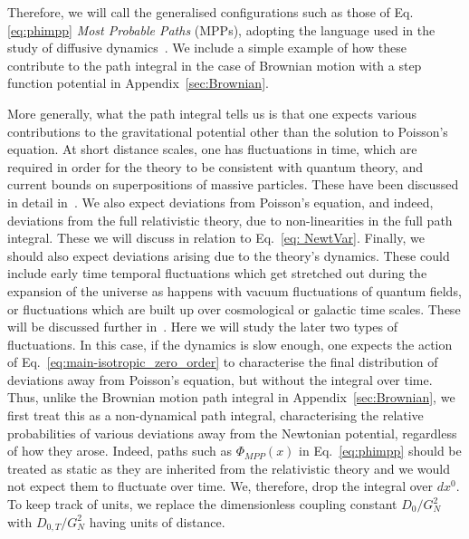 \documentclass[aps,pra,amsmath,amssymb,amsthm,floatfix,nofootinbib,notitlepage,superscriptaddress,10pt]{revtex4-2}
\begin{document}
Therefore, we will call the generalised configurations such as those of Eq. \eqref{eq:phimpp}
 \textit{Most Probable Paths} (MPPs), adopting the language used in the study of diffusive dynamics~\cite{feynman1965quantum,durr1978onsager,chao2019onsager}.  We include a simple example of how these contribute to the path integral in the case of Brownian motion with a step function potential in Appendix~\ref{sec:Brownian}. 

More generally, what the path integral tells us is that one expects various contributions to the gravitational potential other than the solution to Poisson's equation. At short distance scales, one has fluctuations in time, which are required in order for the theory to be consistent with quantum theory, and current bounds on superpositions of massive particles. These have been discussed in detail in~\cite{oppenheim2023gravitationally,layton2023weak,UCLNordstrom}. We also expect deviations from Poisson's equation, and indeed, deviations from the full relativistic theory, due to non-linearities in the full path integral. These we will discuss in relation to Eq.~\eqref{eq: NewtVar}. Finally, we should also expect deviations arising due to the theory's dynamics. These could include early time temporal fluctuations which get stretched out during the expansion of the universe as happens with vacuum fluctuations of quantum fields, or fluctuations which are built up over cosmological or galactic time scales. These will be discussed further in~\cite{UCLcosmo}. Here we will study the later two types of fluctuations. In this case, if the dynamics is slow enough, one expects the action of Eq.~\eqref{eq:main-isotropic_zero_order}  to characterise the final distribution of deviations away from Poisson's equation, but without the integral over time. Thus,
unlike the Brownian motion path integral in Appendix~\ref{sec:Brownian}, we first treat this as a non-dynamical path integral, characterising the relative probabilities of various deviations away from the Newtonian potential, regardless of how they arose. Indeed, paths such as $\Phi_{MPP}(x)$ in Eq.~\eqref{eq:phimpp} should be treated as static as they are inherited from the relativistic theory and we would not expect them to fluctuate over time. 
We, therefore, drop the integral over $dx^0$. To keep track of units, we replace the dimensionless coupling constant $D_0/G_N^2$ with $D_{0,T}/G_N^2$ having units of distance. 
\end{document}
